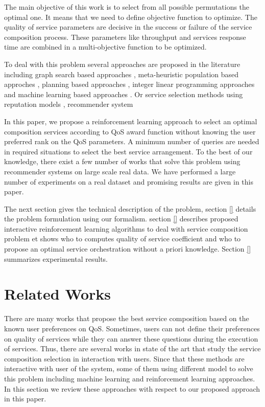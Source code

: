 \documentclass[10pt,journal,compsoc]{IEEEtran}
\begin{document}
The main objective of this work is to select from all possible permutations the optimal one.  It means that we need to define objective function to optimize.  The quality of service parameters are  decisive in the success or failure of the service composition process.  These parameters like throughput and services response time are combined in a multi-objective function to be optimized.  

To deal with this problem several approaches are proposed in the literature including graph search based approaches \cite{deng2014,jiang2014,Rodriguez2016,Siebert2015}, meta-heuristic population based approches \cite{}, planning based approaches \cite{chen2017,Zou2014}, integer linear programming approaches \cite{} and machine learning based approaches \cite{}. Or service selection methods using reputation models \cite{Wang2007,Wang2011},  recommender system \cite{Manikrao2005,Liu2005}


In this paper, we propose a reinforcement learning approach to select an optimal composition services according to QoS award function without knowing the user preferred rank on the QoS parameters. A minimum number of queries are needed in required situations to select the best service arrangement. To the best of our knowledge, there exist a few number of works that solve this problem using recommender systems on large scale real data. We have performed a large number of experiments on a real dataset \cite{Zheng2014} and promising results are given in this paper.

The next section gives the technical description of the problem, section \ref{} details the problem formulation using our formalism. section \ref{} describes proposed interactive reinforcement learning algorithms to deal with service composition problem et shows who to computes  quality of service coefficient and who to propose an optimal service orchestration without a priori knowledge. Section \ref{} summarizes experimental results.  

\section{Related Works}\label{sec:related-work}

There are many works that propose the best service composition based on the known user preferences on QoS. Sometimes, users can not define their preferences on quality of services while they can answer these questions during the execution of services. Thus, there are several works in state of the art that study the service composition selection in interaction with users. Since that these methods are interactive with user of the system, some of them using different model to solve this problem including machine learning and reinforcement learning approaches. In this section we review these approaches with respect to our proposed approach in this paper. 
\end{document}
